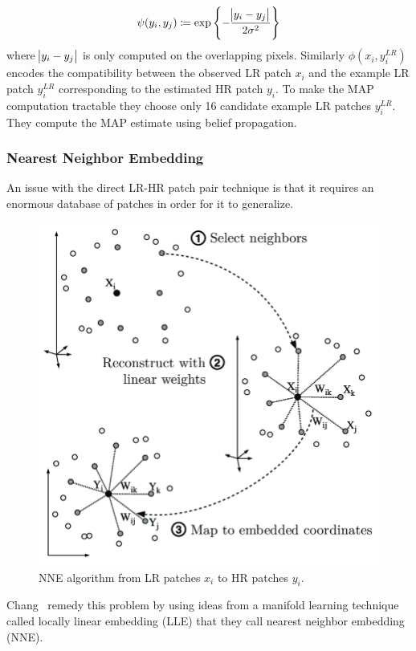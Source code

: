 \begin{equation}
    \psi(y_i, y_j) \coloneqq \exp \left\{ -  \frac{\abs{ y_i - y_j }}{2\sigma^2} \right\}
\end{equation}
where \(\abs{ y_i - y_j }\) is only computed on the overlapping pixels.
%
Similarly \(\phi(x_i, y_i^{LR})\) encodes the compatibility between the observed LR patch \(x_i\) and the example LR patch \(y_i^{LR}\) corresponding to the estimated HR patch \(y_i\).
%
To make the MAP computation tractable they choose only 16 candidate example LR patches \(y_i^{LR}\).
%
They compute the MAP estimate using belief propagation.

\subsubsection{Nearest Neighbor Embedding}
An issue with the direct LR-HR patch pair technique is that it requires an enormous database of patches in order for it to generalize.
%
\begin{figure}
    \centering
    \includegraphics[width=\linewidth,keepaspectratio]{figures/classical/lle.png}
    \caption{NNE algorithm from LR patches \(x_i\) to HR patches \(y_i\)\cite{Guillermophdthesis}.}
    \label{fig:lle}
\end{figure}
Chang \etal~remedy this problem by using ideas from a manifold learning technique called locally linear embedding\cite{saul2000introduction} (LLE) that they call nearest neighbor embedding (NNE).
